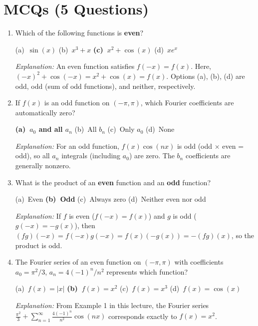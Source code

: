 \documentclass[12pt,a4paper]{article}
\begin{document}
\section{MCQs (5 Questions)}

\begin{enumerate}[label=\textbf{MCQ\arabic*.}]

\item Which of the following functions is \textbf{even}?

  (a)\ $\sin(x)$ \quad
  (b)\ $x^3 + x$ \quad
  \textbf{(c)\ $x^2 + \cos(x)$} \quad
  (d)\ $xe^x$

  \textit{Explanation:} An even function satisfies $f(-x) = f(x)$. Here,
  $(-x)^2 + \cos(-x) = x^2 + \cos(x) = f(x)$. Options (a), (b), (d) are odd, odd (sum of
  odd functions), and neither, respectively.

\item If $f(x)$ is an odd function on $(-\pi,\pi)$, which Fourier coefficients are
  automatically zero?

  \textbf{(a)\ $a_0$ and all $a_n$} \quad
  (b)\ All $b_n$ \quad
  (c)\ Only $a_0$ \quad
  (d)\ None

  \textit{Explanation:} For an odd function, $f(x)\cos(nx)$ is odd (odd $\times$ even = odd),
  so all $a_n$ integrals (including $a_0$) are zero. The $b_n$ coefficients are generally
  nonzero.

\item What is the product of an \textbf{even} function and an \textbf{odd} function?

  (a)\ Even \quad
  \textbf{(b)\ Odd} \quad
  (c)\ Always zero \quad
  (d)\ Neither even nor odd

  \textit{Explanation:} If $f$ is even ($f(-x)=f(x)$) and $g$ is odd ($g(-x)=-g(x)$), then
  $(fg)(-x) = f(-x)g(-x) = f(x)(-g(x)) = -(fg)(x)$, so the product is odd.

\item The Fourier series of an even function on $(-\pi,\pi)$ with coefficients
  $a_0 = \pi^2/3$, $a_n = 4(-1)^n/n^2$ represents which function?

  (a)\ $f(x) = |x|$ \quad
  \textbf{(b)\ $f(x) = x^2$} \quad
  (c)\ $f(x) = x^3$ \quad
  (d)\ $f(x) = \cos(x)$

  \textit{Explanation:} From Example 1 in this lecture, the Fourier series
  $\frac{\pi^2}{3} + \sum_{n=1}^{\infty}\frac{4(-1)^n}{n^2}\cos(nx)$ corresponds exactly to
  $f(x) = x^2$.


\end{enumerate}
\end{document}
